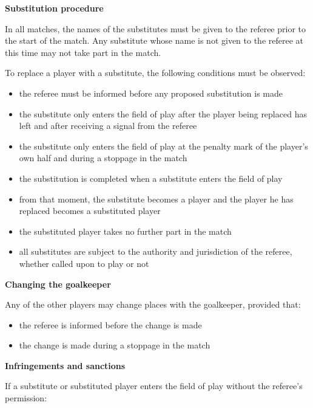 {\bfseries Substitution procedure}

\headlinebox

In all matches, the names of the substitutes must be given to the referee prior to the start of the match. Any substitute whose name is not given to the referee at this time may not take part in the match.

\bigskip

To replace a player with a substitute, the following conditions must be observed:

\begin{itemize}
\item the referee must be informed before any proposed substitution is made
\item the substitute only enters the field of play after the player being replaced has left and after receiving a signal from the referee
\item the substitute only enters the field of play at the penalty mark of the player's own half  and during a stoppage in the match 
\item the substitution is completed when a substitute enters the field of play
\item from that moment, the substitute becomes a player and the player he has replaced becomes a substituted player 
\item the substituted player takes no further part in the match
\item all substitutes are subject to the authority and jurisdiction of the referee, whether called upon to play or not
\end{itemize}

{\bfseries Changing the goalkeeper}

\headlinebox

Any of the other players may change places with the goalkeeper, provided that:

\begin{itemize}
\item the referee is informed before the change is made
\item the change is made during a stoppage in the match
\end{itemize}

{\bfseries Infringements and sanctions}

\headlinebox

If a substitute or substituted player enters the field of play without the referee's permission:

